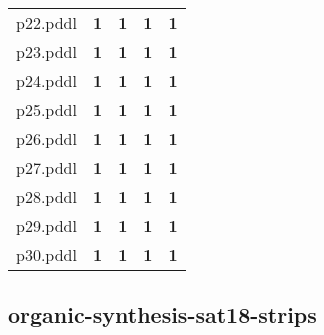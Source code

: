 \documentclass{article}
\begin{document}
\begin{tabular}{@{}lrrrr@{}}
p22.pddl & \textbf{1} & \textbf{1} & \textbf{1} & \textbf{1} \\
p23.pddl & \textbf{1} & \textbf{1} & \textbf{1} & \textbf{1} \\
p24.pddl & \textbf{1} & \textbf{1} & \textbf{1} & \textbf{1} \\
p25.pddl & \textbf{1} & \textbf{1} & \textbf{1} & \textbf{1} \\
p26.pddl & \textbf{1} & \textbf{1} & \textbf{1} & \textbf{1} \\
p27.pddl & \textbf{1} & \textbf{1} & \textbf{1} & \textbf{1} \\
p28.pddl & \textbf{1} & \textbf{1} & \textbf{1} & \textbf{1} \\
p29.pddl & \textbf{1} & \textbf{1} & \textbf{1} & \textbf{1} \\
p30.pddl & \textbf{1} & \textbf{1} & \textbf{1} & \textbf{1} \\
\end{tabular}

\hypertarget{coverage-organic-synthesis-sat18-strips}{}
\subsection*{organic-synthesis-sat18-strips}
\end{document}
